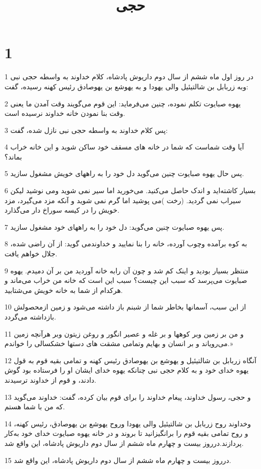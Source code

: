 

\title{حجی}


\chapter{1}

\par 1 در روز اول ماه ششم از سال دوم داریوش پادشاه، کلام خداوند به واسطه حجی نبی وبه زربابل بن شالتیئیل والی یهودا و به یهوشع بن یهوصادق رئیس کهنه رسیده، گفت:
\par 2 یهوه صبایوت تکلم نموده، چنین می‌فرماید: این قوم می‌گویند وقت آمدن ما یعنی وقت بنا نمودن خانه خداوند نرسیده است.
\par 3 پس کلام خداوند به واسطه حجی نبی نازل شده، گفت:
\par 4 آیا وقت شماست که شما در خانه های مسقف خود ساکن شوید و این خانه خراب بماند؟
\par 5 پس حال یهوه صبایوت چنین می‌گوید دل خود را به راههای خویش مشغول سازید.
\par 6 بسیار کاشته‌اید و اندک حاصل می‌کنید. می‌خورید اما سیر نمی شوید ومی نوشید لیکن سیراب نمی گردید. (رخت )می پوشید اما گرم نمی شوید و آنکه مزد می‌گیرد، مزد خویش را در کیسه سوراخ دار می‌گذارد.
\par 7 پس یهوه صبایوت چنین می‌گوید: دل خود را به راههای خود مشغول سازید.
\par 8 به کوه برآمده وچوب آورده، خانه را بنا نمایید و خداوندمی گوید: از آن راضی شده، جلال خواهم یافت.
\par 9 منتظر بسیار بودید و اینک کم شد و چون آن رابه خانه آوردید من بر آن دمیدم. یهوه صبایوت می‌پرسد که سبب این چیست؟ سبب این است که خانه من خراب می‌ماند و هرکدام از شما به خانه خویش می‌شتابید.
\par 10 از این سبب، آسمانها بخاطر شما از شبنم باز داشته می‌شود و زمین ازمحصولش بازداشته می‌گردد.
\par 11 و من بر زمین وبر کوهها و بر غله و عصیر انگور و روغن زیتون وبر هر‌آنچه زمین می‌رویاند و بر انسان و بهایم وتمامی مشقت های دستها خشکسالی را خواندم.»
\par 12 آنگاه زربابل بن شالتیئیل و یهوشع بن یهوصادق رئیس کهنه و تمامی بقیه قوم به قول یهوه خدای خود و به کلام حجی نبی چنانکه یهوه خدای ایشان او را فرستاده بود گوش دادند، و قوم از خداوند ترسیدند.
\par 13 و حجی، رسول خداوند، پیغام خداوند را برای قوم بیان کرده، گفت: خداوند می‌گوید که من با شما هستم.
\par 14 وخداوند روح زربابل بن شالتیئیل والی یهودا وروح یهوشع بن یهوصادق، رئیس کهنه، و روح تمامی بقیه قوم را برانگیزانید تا بروند و در خانه یهوه صبایوت خدای خود به‌کار پردازند.درروز بیست و چهارم ماه ششم از سال دوم داریوش پادشاه، این واقع شد.
\par 15 درروز بیست و چهارم ماه ششم از سال دوم داریوش پادشاه، این واقع شد.

